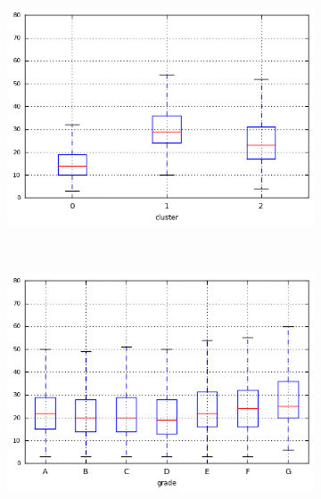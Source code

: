 \begin{anexosenv}
\begin{figure}[t!]
\begin{subfigure}[t]{0.45\textwidth}
        \end{subfigure}
\end{figure}



\begin{figure}[ht!]
    \centering
                \caption{\emph{Boxplots} de total\textunderscore acc}
        \begin{subfigure}[t]{0.45\textwidth}
            \centering

            \centerline{\includegraphics[width=1.05\textwidth]{img/total_acc_by_cluster}}
        \end{subfigure}%
        ~ 
        \begin{subfigure}[t]{0.45\textwidth}
            \centering
   
            \centerline{\includegraphics[width=1.05\textwidth]{img/total_acc_by_grade}}


\end{subfigure}
\end{figure}
\end{anexosenv}
